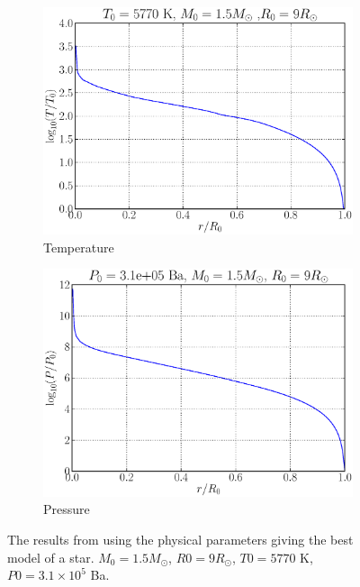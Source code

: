 \documentclass[a4paper, 11pt, english]{article}
\begin{document}
\begin{figure}[htpb]
\begin{subfigure}{0.49\textwidth}
		\includegraphics[width=\linewidth]{figures/temperature_1-5Msun.eps}
		\caption{Temperature}
		\label{fig:temperature_9Rsun}
	\end{subfigure}\hfill
	\begin{subfigure}{0.49\textwidth}
		\includegraphics[width=\linewidth]{figures/pressure_1-5Msun.eps}
		\caption{Pressure}
		\label{fig:pressure_9Rsun}
	\end{subfigure}
	\vspace{0.2cm}
	\caption{The results from using the physical parameters giving the best model of a
		star. $M_0 = 1.5M_{\odot}$, $R0 = 9R_{\odot}$, $T0 = 5770$ K, $P0 = 3.1 \times
	10^5$ Ba.}
		\label{fig:parameters_9Rsun}
\end{figure}
\end{document}

